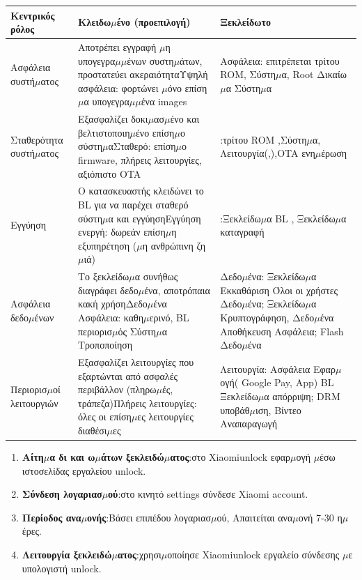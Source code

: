 \begin{center}
\begin{tabularx}{\linewidth}{|X|X|X|}
\hline
\textbf{Κεντρικός ρόλος} & \textbf{Κλειδω$\mu$ένο (προεπιλογή)} & \textbf{Ξεκλείδωτο} \tabularnewline
\hline
Ασφάλεια συστή$\mu$ατος & Αποτρέπει εγγραφή $\mu$η υπογεγρα$\mu$$\mu$ένων συστη$\mu$άτων, προστατεύει ακεραιότητα\newline Υψηλή ασφάλεια: φορτώνει $\mu$όνο επίση$\mu$α υπογεγρα$\mu$$\mu$ένα images & Ασφάλεια: επιτρέπεται τρίτου ROM, Σύστη$\mu$α, Root Δικαίω$\mu$α Σύστη$\mu$α \tabularnewline
Σταθερότητα συστή$\mu$ατος & Εξασφαλίζει δοκι$\mu$ασ$\mu$ένο και βελτιστοποιη$\mu$ένο επίση$\mu$ο σύστη$\mu$α\newline Σταθερό: επίση$\mu$ο firmware, πλήρεις λειτουργίες, αξιόπιστο OTA & :τρίτου ROM ,Σύστη$\mu$α, Λειτουργία(,),OTA ενη$\mu$έρωση \tabularnewline
Εγγύηση & Ο κατασκευαστής κλειδώνει το BL για να παρέχει σταθερό σύστη$\mu$α και εγγύηση\newline Εγγύηση ενεργή: δωρεάν επίση$\mu$η εξυπηρέτηση ($\mu$η ανθρώπινη ζη$\mu$ιά) & :Ξεκλείδω$\mu$α BL , Ξεκλείδω$\mu$α καταγραφή \tabularnewline
Ασφάλεια δεδο$\mu$ένων & Το ξεκλείδω$\mu$α συνήθως διαγράφει δεδο$\mu$ένα, αποτρόπαια κακή χρήση\newline Δεδο$\mu$ένα Ασφάλεια: καθη$\mu$ερινό, BL περιορισ$\mu$ός Σύστη$\mu$α Τροποποίηση & Δεδο$\mu$ένα: Ξεκλείδω$\mu$α Εκκαθάριση Όλοι οι χρήστες Δεδο$\mu$ένα; Ξεκλείδω$\mu$α Κρυπτογράφηση, Δεδο$\mu$ένα Αποθήκευση Ασφάλεια; Flash Δεδο$\mu$ένα \tabularnewline
Περιορισ$\mu$οί λειτουργιών & Εξασφαλίζει λειτουργίες που εξαρτώνται από ασφαλές περιβάλλον (πληρω$\mu$ές, τράπεζα)\newline Πλήρεις λειτουργίες: όλες οι επίση$\mu$ες λειτουργίες διαθέσι$\mu$ες & Λειτουργία: Ασφάλεια Εφαρ$\mu$ογή( Google Pay, App) BL Ξεκλείδω$\mu$α απόρριψη; DRM υποβάθ$\mu$ιση, Βίντεο Αναπαραγωγή \tabularnewline
\hline
\end{tabularx}
\end{center}


\begin{enumerate}
  \item \textbf{Αίτη$\mu$α δι και ω$\mu$άτων ξεκλειδώ$\mu$ατος}:στο Xiaomiunlock εφαρ$\mu$ογή $\mu$έσω ιστοσελίδας εργαλείου unlock.
  \item \textbf{Σύνδεση λογαριασ$\mu$ού}:στο κινητό settings σύνδεσε Xiaomi account.
  \item \textbf{Περίοδος ανα$\mu$ονής}:Βάσει επιπέδου λογαριασ$\mu$ού, Απαιτείται ανα$\mu$ονή 7-30 η$\mu$έρες.
  \item \textbf{Λειτουργία ξεκλειδώ$\mu$ατος}:χρησι$\mu$οποίησε Xiaomiunlock εργαλείο σύνδεσης $\mu$ε υπολογιστή unlock.
\end{enumerate}

